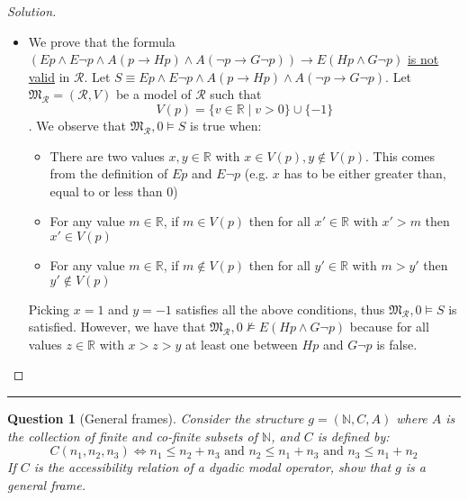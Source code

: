 \documentclass[12pt,a4paper]{report}
\newtheorem{question}{Question}
\theoremstyle{definition}
\newcommand{\N}{\mathbb{N}}                     %
\newcommand{\R}{\mathbb{R}}                     %
\newcommand{\model}[1]{\mathfrak{#1}}           %
\begin{document}
\begin{proof}[Solution]
\begin{itemize}
            \item We prove that the formula $(Ep \land E \lnot p \land A(p \to Hp) \land A(\lnot p \to G \lnot p)) \to E(Hp \land G \lnot p)$ \underline{is not valid} in $\mathcal{R}$. Let $S \equiv Ep \land E \lnot p \land A(p \to Hp) \land A(\lnot p \to G \lnot p)$. Let $\model{M}_{\mathcal{R}} = (\mathcal{R}, V)$ be a model of $\mathcal{R}$ such that
            \[V(p) = \{v \in \R \mid v > 0\} \cup \{-1\}\]. We observe that $\model{M}_{\mathcal{R}}, 0 \models S$ is true when:
            \begin{itemize}
                \item There are two values $x,y \in \R$ with $x \in V(p), y \notin V(p)$. This comes from the definition of $E p$ and $E \lnot p$ (e.g. $x$ has to be either greater than, equal to or less than $0$)
                \item For any value $m \in \R$, if $m \in V(p)$ then for all $x' \in \R$ with $x' > m$ then $x' \in V(p)$
                \item For any value $m \in \R$, if $m \notin V(p)$ then for all $y' \in \R$ with $m > y'$ then $y' \notin V(p)$
            \end{itemize}

            Picking $x = 1$ and $y = -1$ satisfies all the above conditions, thus $\model{M}_{\mathcal{R}}, 0 \models S$ is satisfied. However, we have that $\model{M}_{\mathcal{R}}, 0 \not\models E(Hp \land G \lnot p)$ because for all values $z \in \R$ with $x > z > y$ at least one between $Hp$ and $G \lnot p$ is false.
        \end{itemize}
    \end{proof}

    \quad

    \hrule

    \quad

    \begin{question}[General frames]
        Consider the structure $g = (\N, C, A)$ where $A$ is the collection of finite and co-finite subsets of $\N$, and $C$ is defined by:
        \[C(n_1, n_2, n_3) \iff n_1 \leq n_2 + n_3 \text{ and } n_2 \leq n_1 + n_3 \text{ and } n_3 \leq n_1 + n_2\]
        If $C$ is the accessibility relation of a dyadic modal operator, show that $g$ is a general frame.
    \end{question}
\end{document}
